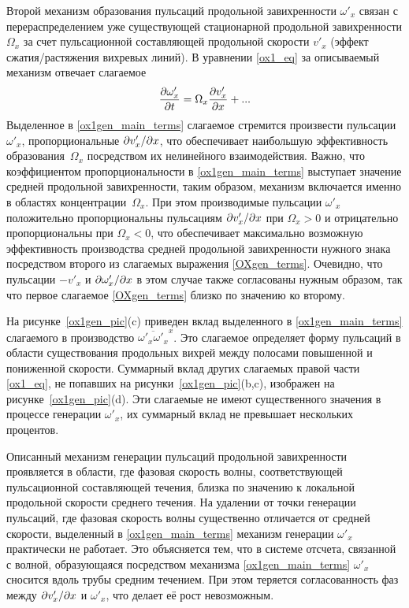 Второй механизм образования пульсаций продольной завихренности $\omega'_x$ связан с перераспределением уже существующей стационарной продольной завихренности $\Omega_x$ за счет пульсационной составляющей продольной скорости $v'_x$ (эффект сжатия/растяжения вихревых линий). В уравнении \eqref{ox1_eq} за описываемый механизм отвечает слагаемое
\begin{equation}\label{ox1gen_main_terms}
\frac{\partial \omega'_x}{\partial t} = \Omega_x \frac {\partial v'_x}{\partial x} + ...
\end{equation}
Выделенное в \eqref{ox1gen_main_terms} слагаемое стремится произвести пульсации $\omega'_x$, пропорциональные $\partial v'_x / \partial x$, что обеспечивает наибольшую эффективность образования~$\Omega_x$ посредством их нелинейного взаимодействия. Важно, что коэффициентом пропорциональности в \eqref{ox1gen_main_terms} выступает значение средней продольной завихренности, таким образом, механизм включается именно в областях концентрации~$\Omega_x$. При этом производимые пульсации $\omega'_x$ положительно пропорциональны пульсациям  $\partial v'_x / \partial x$ при $\Omega_x>0$ и отрицательно пропорциональны при $\Omega_x<0$, что обеспечивает максимально возможную эффективность производства средней продольной завихренности нужного знака посредством второго из слагаемых выражения \eqref{OXgen_terms}. Очевидно, что пульсации $-v'_x$ и $\partial \omega'_x / \partial x$ в этом случае также согласованы нужным образом, так что первое слагаемое \eqref{OXgen_terms} близко по значению ко второму.

На рисунке~\ref{ox1gen_pic}(c) приведен вклад выделенного в \eqref{ox1gen_main_terms} слагаемого в производство $\overline{\omega'_x \omega'_x}^x$. Это слагаемое определяет форму пульсаций в области существования продольных вихрей между полосами повышенной и пониженной скорости. Суммарный вклад других слагаемых правой части \eqref{ox1_eq}, не попавших на рисунки~\ref{ox1gen_pic}(b,c), изображен на рисунке~\ref{ox1gen_pic}(d). Эти слагаемые не имеют существенного значения в процессе генерации $\omega'_x$, их суммарный вклад не превышает нескольких процентов. 

Описанный механизм генерации пульсаций продольной завихренности проявляется в области, где фазовая скорость волны, соответствующей пульсационной составляющей течения, близка по значению к локальной продольной скорости среднего течения. На удалении от точки генерации пульсаций, где фазовая скорость волны существенно отличается от средней скорости, выделенный в \eqref{ox1gen_main_terms} механизм генерации $\omega'_x$ практически не работает. Это объясняется тем, что в системе отсчета, связанной с волной, образующаяся посредством механизма \eqref{ox1gen_main_terms} $\omega'_x$ сносится вдоль трубы средним течением. При этом теряется согласованность фаз между $\partial v'_x / \partial x$ и $\omega'_x$, что делает её рост невозможным. 


